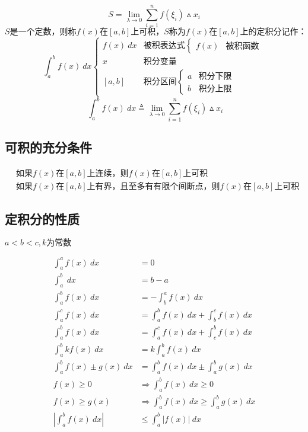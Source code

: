	$$S=\lim\limits_{\lambda \to 0}\sum\limits_{i=1}^{n}f(\xi_i)\vartriangle x_i$$
	$$S\mbox{是一个定数，则称}f(x)\mbox{在}\left[a,b\right]\mbox{上可积，}S\mbox{称为}f(x)\mbox{在}\left[a,b\right]\mbox{上的定积分记作：}$$
	$$\int_{a}^{b}f(x)\ dx\begin{cases}
		f(x) \ dx &\mbox{被积表达式}\begin{cases}
			f(x) &\mbox{被积函数}
		\end{cases}\\
		x &\mbox{积分变量}\\
		\left[a,b\right]&\mbox{积分区间}\begin{cases}
				a &\mbox{积分下限}\\  
			b &\mbox{积分上限}
		\end{cases}
	\end{cases}$$
	$$\ \int_{a}^{b}f(x) \ dx\triangleq\lim\limits_{\lambda \to 0}\sum_{i=1}^{n}f(\xi_i)\vartriangle x_i$$
\subsection{可积的充分条件}
	\begin{align}
			&\mbox{如果}f(x)\mbox{在}\left[a,b\right]\mbox{上连续，则}f(x)\mbox{在}\left[a,b\right]\mbox{上可积}\\
			&\mbox{如果}f(x)\mbox{在}\left[a,b\right]\mbox{上有界，且至多有有限个间断点，则}f(x)\mbox{在}\left[a,b\right]\mbox{上可积}
	\end{align}
\subsection{定积分的性质}
	\centerline{$a<b<c,k\mbox{为常数}$}
	\vspace{-5mm}
	\begin{align}	
		\int_{a}^{a}f(x)\ dx&=0 \label{Definite_integral_property_1}\\
		\int_{a}^{b}\ dx &=b-a \label{Definite_integral_property_2}\\
		\int_{a}^{b}f(x)\ dx&=-\int_{b}^{a}f(x)\ dx \label{Definite_integral_property_3}\\
		\int_{a}^{c}f(x)\ dx&=\int_{a}^{b} f(x)\ dx+\int_{b}^{c}f(x)\ dx \label{Definite_integral_property_4}\\
		\int_{a}^{b}f(x)\ dx&=\int_{a}^{c}f(x)\ dx+\int_{c}^{b}f(x)\ dx \label{Definite_integral_property_5}\\
		\int_{a}^{b}kf(x)\ dx&=k\int_{a}^{b}f(x)\ dx \label{Definite_integral_property_6}\\
		\int_{a}^{b}f(x)\pm g(x)\ dx&=\int_{a}^{b}f(x)\ dx\pm \int_{a}^{b}g(x)\ dx\label{Definite_integral_property_7} \\
		f(x)\geqslant 0\quad &\Rightarrow \int_{a}^{b}f(x)\ dx\geqslant 0 \label{Definite_integral_property_8}\\
		f(x)\geqslant g(x)\quad &\Rightarrow \int_{a}^{b}f(x)\ dx\geqslant \int_{a}^{b}g(x)\ dx \label{Definite_integral_property_9}\\
		\left|\int_{a}^{b}f(x) \ dx\right|&\leqslant \int_{a}^{b}\left|f(x)\right|\ dx \label{Definite_integral_property_10}
	\end{align}
